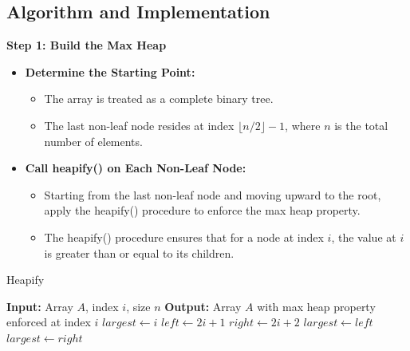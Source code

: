 \subsection{Algorithm and Implementation}

\textbf{Step 1: Build the Max Heap}
\begin{itemize}
    \item \textbf{Determine the Starting Point:}
    \begin{itemize}
        \item The array is treated as a complete binary tree.
        \item The last non-leaf node resides at index $\lfloor n/2 \rfloor - 1$, where $n$ is the total number of elements.
    \end{itemize}
    \item \textbf{Call heapify() on Each Non-Leaf Node:}
    \begin{itemize}
        \item Starting from the last non-leaf node and moving upward to the root, apply the heapify() procedure to enforce the max heap property.
        \item The heapify() procedure ensures that for a node at index $i$, the value at $i$ is greater than or equal to its children.
    \end{itemize}
\end{itemize}

\begin{algorithm}
    \caption{Heapify}
    \begin{algorithmic}[1]
        \State \textbf{Input:} Array $A$, index $i$, size $n$
        \State \textbf{Output:} Array $A$ with max heap property enforced at index $i$
        \State $largest \gets i$
        \State $left \gets 2i + 1$
        \State $right \gets 2i + 2$
        \State $largest \gets left$
        \EndIf
        \State $largest \gets right$
        \EndIf
        \State {}
        \State {}
        \EndIf
        \EndFunction
    \end{algorithmic}
\end{algorithm}


